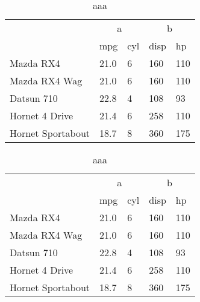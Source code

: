 \documentclass[]{article}
\newenvironment{Shaded}{\begin{snugshade}}{\end{snugshade}}
\newcommand{\KeywordTok}[1]{\textcolor[rgb]{0.13,0.29,0.53}{\textbf{{#1}}}}
\newcommand{\DataTypeTok}[1]{\textcolor[rgb]{0.13,0.29,0.53}{{#1}}}
\newcommand{\DecValTok}[1]{\textcolor[rgb]{0.00,0.00,0.81}{{#1}}}
\newcommand{\StringTok}[1]{\textcolor[rgb]{0.31,0.60,0.02}{{#1}}}
\newcommand{\NormalTok}[1]{{#1}}
\begin{document}
\begingroup
{}

\begin{longtable}[t]{p{}p{}p{}p{}p{}}
\caption{\label{tab:unnamed-chunk-3}aaa}\\
\toprule
\multicolumn{1}{c}{ } & \multicolumn{2}{c}{a} & \multicolumn{2}{c}{b} \\ \cmidrule(l{2pt}r{2pt}){2-3} \cmidrule(l{2pt}r{2pt}){4-5}
  & mpg & cyl & disp & hp\\
\midrule
Mazda RX4 & 21.0 & 6 & 160 & 110\\
Mazda RX4 Wag & 21.0 & 6 & 160 & 110\\
Datsun 710 & 22.8 & 4 & 108 & 93\\
Hornet 4 Drive & 21.4 & 6 & 258 & 110\\
Hornet Sportabout & 18.7 & 8 & 360 & 175\\
\bottomrule
\end{longtable}
\endgroup

\begin{Shaded}
\end{Shaded}


\begin{table}[!h]

\caption{\label{tab:unnamed-chunk-4}aaa}
\centering
\begin{tabular}[t]{p{}p{}p{}p{}p{}}
\toprule
\multicolumn{1}{c}{ } & \multicolumn{2}{c}{a} & \multicolumn{2}{c}{b} \\ \cmidrule(l{2pt}r{2pt}){2-3} \cmidrule(l{2pt}r{2pt}){4-5}
  & mpg & cyl & disp & hp\\
\midrule
Mazda RX4 & 21.0 & 6 & 160 & 110\\
Mazda RX4 Wag & 21.0 & 6 & 160 & 110\\
Datsun 710 & 22.8 & 4 & 108 & 93\\
Hornet 4 Drive & 21.4 & 6 & 258 & 110\\
Hornet Sportabout & 18.7 & 8 & 360 & 175\\
\bottomrule
\end{tabular}
\end{table}

\end{document}
